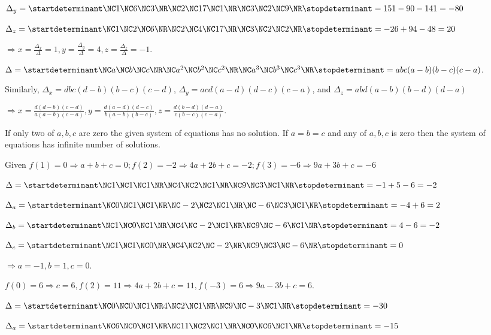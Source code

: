   $\Delta_y = \startdeterminant\NC 1\NC 6\NC 3\NR\NC 2\NC 17\NC 1\NR\NC 3\NC 2\NC 9\NR\stopdeterminant = 151
  - 90 - 141 = -80$

  $\Delta_z = \startdeterminant\NC1\NC2\NC6\NR\NC 2\NC 4\NC 17\NR\NC 3\NC 2\NC 2\NR\stopdeterminant = -26 +
  94 - 48 = 20$

  $\Rightarrow x = \frac{\Delta_x}{\Delta} = 1, y = \frac{\Delta_y}{\Delta} = 4, z = \frac{\Delta_z}{\Delta}
  = -1$.
\item $\Delta = \startdeterminant\NC a\NC b\NC c\NR\NC a^2\NC b^2\NC c^2\NR\NC a^3\NC b^3\NC
  c^3\NR\stopdeterminant = abc(a - b)(b - c)(c - a)$.

  Similarly, $\Delta_x = dbc(d - b)(b - c)(c - d)$, $\Delta_y = acd(a - d)(d - c)(c - a)$, and $\Delta_z =
  abd(a - b)(b - d)(d - a)$

  $\Rightarrow x = \frac{d(d - b)(c - d)}{a(a - b)(c - a)}, y = \frac{d(a - d)(d - c)}{b(a - b)(b - c)}, z =
  \frac{d(b - d)(d - a)}{c(b - c)(c - a)}$.

  If only two of $a, b, c$ are zero the given system of equations has no solution. If $a = b = c$ and any of
  $a, b, c$ is zero then the system of equations has infinite number of solutions.
\item Given $f(1) = 0 \Rightarrow a + b + c = 0; f(2) = -2 \Rightarrow 4a + 2b + c = -2; f(3) = -6
  \Rightarrow 9a + 3b + c = -6$

  $\Delta = \startdeterminant\NC 1\NC 1\NC 1\NR\NC 4\NC 2\NC 1\NR\NC 9\NC 3\NC 1\NR\stopdeterminant = -1 + 5
  - 6 = -2$

  $\Delta_a = \startdeterminant\NC 0\NC 1\NC 1\NR\NC -2\NC 2\NC 1\NR\NC -6\NC 3\NC 1\NR\stopdeterminant = -4
  + 6 = 2$

  $\Delta_b = \startdeterminant\NC 1\NC 0\NC 1\NR\NC 4\NC -2\NC 1\NR\NC 9\NC -6\NC 1\NR\stopdeterminant = 4
  - 6 = -2$

  $\Delta_c = \startdeterminant\NC 1\NC 1\NC 0\NR\NC 4\NC 2\NC -2\NR\NC 9\NC 3\NC -6\NR\stopdeterminant = 0$

  $\Rightarrow a = -1, b = 1, c = 0$.
\item $f(0) = 6 \Rightarrow c = 6, f(2) = 11\Rightarrow 4a + 2b + c = 11, f(-3) = 6 \Rightarrow 9a - 3b + c
  = 6$.

  $\Delta = \startdeterminant\NC 0\NC 0\NC 1\NR 4\NC 2\NC 1\NR\NC 9\NC -3\NC 1\NR\stopdeterminant = -30$

  $\Delta_a = \startdeterminant\NC 6\NC 0\NC 1\NR\NC 11\NC 2\NC 1\NR\NC 0\NC 6\NC 1\NR\stopdeterminant =
  -15$

